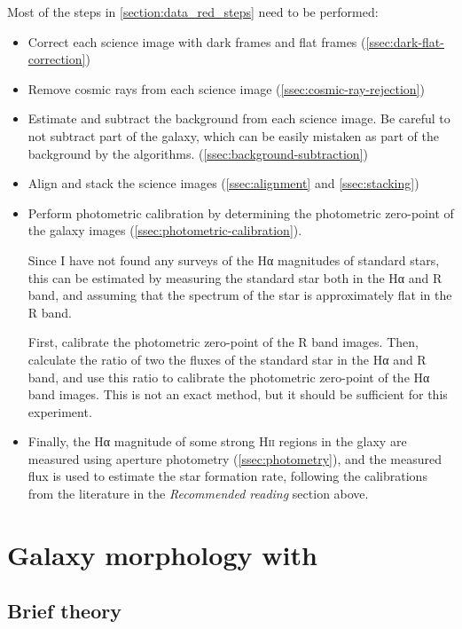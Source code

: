 \documentclass[a4paper, 11pt, fleqn]{memoir}
\begin{document}
Most of the steps in \cref{section:data_red_steps} need to be performed:
\begin{itemize}
    \item Correct each science image with dark frames and flat frames (\cref{ssec:dark-flat-correction})
    \item Remove cosmic rays from each science image (\cref{ssec:cosmic-ray-rejection})
    \item Estimate and subtract the background from each science image. Be careful to not subtract part of the galaxy, which can be easily mistaken as part of the background by the algorithms. (\cref{ssec:background-subtraction})
    \item Align and stack the science images (\cref{ssec:alignment} and \cref{ssec:stacking})
    \item Perform photometric calibration by determining the photometric zero-point of the galaxy images (\cref{ssec:photometric-calibration}).

    Since I have not found any surveys of the Hα magnitudes of standard stars, this can be estimated by measuring the standard star both in the Hα and R band, and assuming that the spectrum of the star is approximately flat in the R band.

    First, calibrate the photometric zero-point of the R band images. Then, calculate the ratio of two the fluxes of the standard star in the Hα and R band, and use this ratio to calibrate the photometric zero-point of the Hα band images.
    This is not an exact method, but it should be sufficient for this experiment.
    \item Finally, the Hα magnitude of some strong H\textsc{ii} regions in the glaxy are measured using aperture photometry (\cref{ssec:photometry}), and the measured flux is used to estimate the star formation rate, following the calibrations from the literature in the \emph{Recommended reading} section above.
\end{itemize}

\section{Galaxy morphology with }

\subsection{Brief theory}
\end{document}
